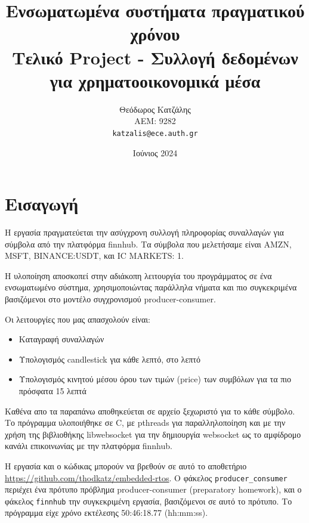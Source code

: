 \documentclass[12pt, a4paper]{article}
\title{\textbf{Ενσωματωμένα συστήματα πραγματικού χρόνου \\ \vspace{0.5cm} \normalsize{Τελικό Project - Συλλογή δεδομένων για χρηματοοικονομικά μέσα}}}
\author{
Θεόδωρος Κατζάλης \\
ΑΕΜ: 9282 \\
\texttt{katzalis@ece.auth.gr}
}
\date{Ιούνιος 2024}
\begin{document}
\sloppy
%
\maketitle




\section{Εισαγωγή}

Η εργασία πραγματεύεται την ασύγχρονη συλλογή πληροφορίας συναλλαγών για σύμβολα από την πλατφόρμα finnhub. Τα σύμβολα που μελετήσαμε είναι AMZN, MSFT, BINANCE:USDT, και IC MARKETS: 1.

Η υλοποίηση αποσκοπεί στην αδιάκοπη λειτουργία του προγράμματος σε ένα ενσωματωμένο σύστημα, χρησιμοποιώντας παράλληλα νήματα και πιο συγκεκριμένα βασιζόμενοι στο μοντέλο συγχρονισμού producer-consumer.

Οι λειτουργίες που μας απασχολούν είναι:

\vspace{-1em}
\begin{itemize}
\itemsep 0em
\item Καταγραφή συναλλαγών
\item Υπολογισμός candlestick για κάθε λεπτό, στο λεπτό
\item Υπολογισμός κινητού μέσου όρου των τιμών (price) των συμβόλων για τα πιο πρόσφατα 15 λεπτά
\end{itemize}
Καθένα απο τα παραπάνω αποθηκεύεται σε αρχείο ξεχωριστό για το κάθε σύμβολο. Το πρόγραμμα υλοποιήθηκε σε C, με pthreads για παραλληλοποίηση και με την χρήση της βιβλιοθήκης libwebsocket για την δημιουργία websocket ως το αμφίδρομο κανάλι επικοινωνίας με την πλατφόρμα finnhub.

Η εργασία και ο κώδικας μπορούν να βρεθούν σε αυτό το αποθετήριο \url{https://github.com/thodkatz/embedded-rtos}. Ο φάκελος \verb|producer_consumer| περιέχει ένα πρότυπο πρόβλημα producer-consumer (preparatory homework), και ο φάκελος \verb|finnhub| την συγκεκριμένη εργασία, βασιζόμενοι σε αυτό το πρότυπο. Το πρόγραμμα είχε χρόνο εκτέλεσης 50:46:18.77 (hh:mm:ss).
\end{document}
